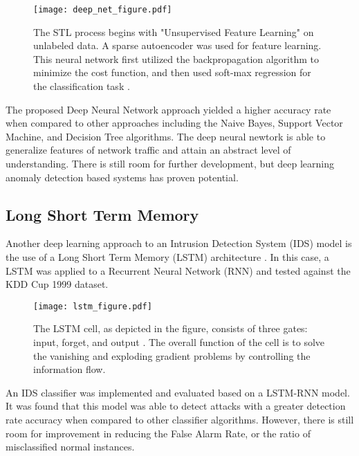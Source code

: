 \documentclass[letterpaper, 10 pt, conference]{ieeeconf}
\begin{document}
\begin{figure}[ht!] %
\centering
\hspace*{0.4cm}
\texttt{[image: deep\_net\_figure.pdf]}
\vspace*{-15mm}
\caption{The STL process begins with "Unsupervised Feature Learning" on unlabeled data. A sparse autoencoder was used for feature learning. This neural network first utilized the backpropagation algorithm to minimize the cost function, and then used soft-max regression for the classification task \cite{c3}.}
\label{deep_net_figure}
\end{figure}

The proposed Deep Neural Network approach yielded a higher accuracy rate when compared to other approaches including the Naive Bayes, Support Vector Machine, and Decision Tree algorithms. The deep neural newtork is able to generalize features of network traffic and attain an abstract level of understanding. There is still room for further development, but deep learning anomaly detection based systems has proven potential.

\hfill
\subsection{Long Short Term Memory}
Another deep learning approach to an Intrusion Detection System (IDS) model is the use of a Long Short Term Memory (LSTM) architecture \cite{c4}. In this case, a LSTM was applied to a Recurrent Neural Network (RNN) and tested against the KDD Cup 1999 dataset.

\begin{figure}[ht!] %
\centering
\hspace*{0.4cm}
\texttt{[image: lstm\_figure.pdf]}
\vspace*{-25mm}
\caption{The LSTM cell, as depicted in the figure, consists of three gates: input, forget, and output \cite{c4}. The overall function of the cell is to solve the vanishing and exploding gradient problems by controlling the information flow.}
\label{lstm_figure}
\end{figure}

An IDS classifier was implemented and evaluated based on a LSTM-RNN model. It was found that this model was able to detect attacks with a greater detection rate accuracy when compared to other classifier algorithms. However, there is still room for improvement in reducing the False Alarm Rate, or the ratio of misclassified normal instances.
\end{document}

